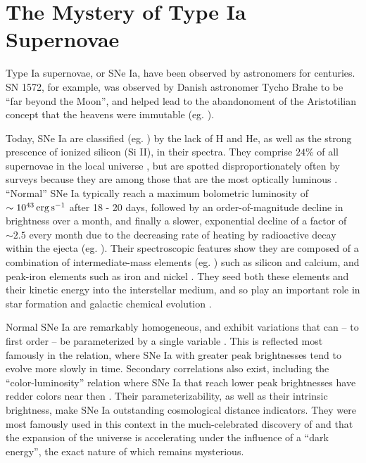 \section{The Mystery of Type Ia Supernovae}
\label{sec:c1_mysteryofsneia}


Type Ia supernovae, or SNe Ia, have been observed by astronomers for centuries.  SN 1572, for example, was observed by Danish astronomer Tycho Brahe to be ``far beyond the Moon'', and helped lead to the abandonoment of the Aristotilian concept that the heavens were immutable (eg. \citealt{clars77}).


Today, SNe Ia are classified (eg. \citealt{fili97, li+11}) by the lack of H and He, as well as the strong prescence of ionized silicon (Si II), in their spectra.  They comprise $24$\% of all supernovae in the local universe \citep{li+11}, but are spotted disproportionately often by surveys because they are among those that are the most optically luminous \citep{howe11}.  ``Normal'' SNe Ia \citep{bran98, bran+06} typically reach a maximum bolometric luminosity of $\sim10^{43}\,\ergpsec$ after 18 - 20 days, followed by an order-of-magnitude decline in brightness over a month, and finally a slower, exponential decline of a factor of $\sim2.5$ every month due to the decreasing rate of heating by radioactive decay within the ejecta (eg. \citealt{fili97, hill+13}).  Their spectroscopic features show they are composed of a combination of intermediate-mass elements (eg. \citealt{arne96}) such as silicon and calcium, and peak-iron elements such as iron and nickel \citep{fili97}.  They seed both these elements and their kinetic energy into the interstellar medium, and so play an important role in star formation and galactic chemical evolution \citep{maozmn14}.


Normal SNe Ia are remarkably homogeneous, and exhibit variations that can -- to first order -- be parameterized by a single variable \citep{hilln00, howe11}.  This is reflected most famously in the \cite{phil93} relation, where SNe Ia with greater peak brightnesses tend to evolve more slowly in time.  Secondary correlations also exist, including the ``color-luminosity'' relation where SNe Ia that reach lower peak brightnesses have redder colors near then \citep{ries+96}.  Their parameterizability, as well as their intrinsic brightness, make SNe Ia outstanding cosmological distance indicators.  They were most famously used in this context in the much-celebrated discovery of \citep{ries+98} and \cite{perl+99} that the expansion of the universe is accelerating under the influence of a ``dark energy'', the exact nature of which remains mysterious.


